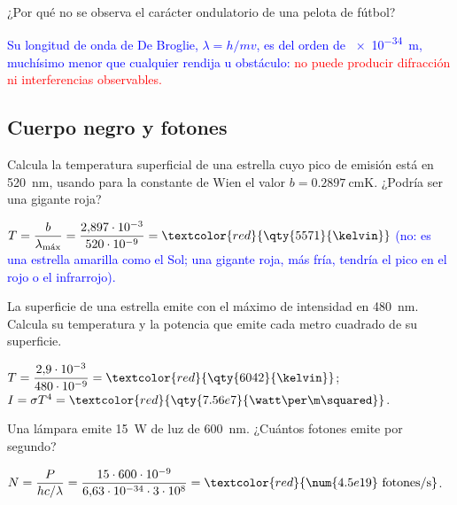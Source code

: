 \begin{exercise}
    ¿Por qué no se observa el carácter ondulatorio de una pelota de fútbol?
    \begin{solu}
        \textcolor{blue}{Su longitud de onda de De Broglie, \(\lambda = h/mv\), es del orden de \qty{e-34}{\m}, muchísimo menor que cualquier rendija
        u obstáculo:} \textcolor{red}{no puede producir difracción ni interferencias observables.}
    \end{solu}
\end{exercise}

\subsection{Cuerpo negro y fotones}

\begin{exercise}
    Calcula la temperatura superficial de una estrella cuyo pico de emisión está en \qty{520}{\nm}, usando para la constante de Wien el
    valor \(b = \qty{0.2897}{\cm\kelvin}\). ¿Podría ser una gigante roja?
    \begin{solu}
        \(T = \dfrac{b}{\lambda_{\text{máx}}} = \dfrac{2{,}897\cdot 10^{-3}}{520\cdot 10^{-9}} = \textcolor{red}{\qty{5571}{\kelvin}}\)
        \textcolor{blue}{(no: es una estrella amarilla como el Sol; una gigante roja, más fría, tendría el pico en el rojo o el infrarrojo).}
    \end{solu}
\end{exercise}

\begin{exercise}
    La superficie de una estrella emite con el máximo de intensidad en \qty{480}{\nm}. Calcula su temperatura y la potencia que emite cada
    metro cuadrado de su superficie.
    \begin{solu}
        \(T = \dfrac{2{,}9\cdot 10^{-3}}{480\cdot 10^{-9}} = \textcolor{red}{\qty{6042}{\kelvin}}\); \(I = \sigma T^4 = \textcolor{red}{\qty{7.56e7}{\watt\per\m\squared}}\).
    \end{solu}
\end{exercise}

\begin{exercise}
    Una lámpara emite \qty{15}{\watt} de luz de \qty{600}{\nm}. ¿Cuántos fotones emite por segundo?
    \begin{solu}
        \(N = \dfrac{P}{hc/\lambda} = \dfrac{15\cdot 600\cdot 10^{-9}}{6{,}63\cdot 10^{-34}\cdot 3\cdot 10^8} = \textcolor{red}{\num{4.5e19}\ \text{fotones/s}}\).
    \end{solu}
\end{exercise}

